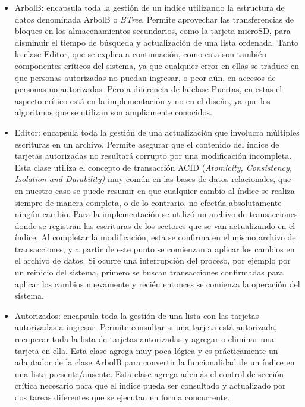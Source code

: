 \begin{itemize}
	\item ArbolB: encapsula toda la gestión de un índice utilizando la estructura de datos denominada ArbolB  o \emph{BTree}. Permite aprovechar las transferencias de bloques en los almacenamientos secundarios, como la tarjeta microSD, para disminuir el tiempo de búsqueda y actualización de una lista ordenada. Tanto la clase Editor, que se explica a continuación, como esta son también componentes críticos del sistema, ya que cualquier error en ellas se traduce en que personas autorizadas no puedan ingresar, o peor aún, en accesos de personas no autorizadas. Pero a diferencia de la clase Puertas, en estas el aspecto crítico está en la implementación y no en el diseño, ya que los algoritmos que se utilizan son ampliamente conocidos.
		
	\item Editor: encapsula toda la gestión de una actualización que involucra múltiples escrituras en un archivo. Permite asegurar que el contenido del índice de tarjetas autorizadas no resultará corrupto por una modificación incompleta. Esta clase utiliza el concepto de transacción ACID (\emph{Atomicity, Consistency, Isolation and Durability)} muy común en las bases de datos relacionales, que en nuestro caso se puede resumir en que cualquier cambio al índice se realiza siempre de manera completa, o de lo contrario, no efectúa absolutamente ningún cambio. Para la implementación se utilizó un archivo de transacciones donde se registran las escrituras de los sectores que se van actualizando en el índice. Al completar la modificación, esta se confirma en el mismo archivo de transacciones, y a partir de este punto se comienzan a aplicar los cambios en el archivo de datos. Si ocurre una interrupción del proceso, por ejemplo por un reinicio del sistema, primero se buscan transacciones confirmadas para aplicar los cambios nuevamente y recién entonces se comienza la operación del sistema.

\FloatBarrier

	\item Autorizados: encapsula toda la gestión de una lista con las tarjetas autorizadas a ingresar. Permite consultar si una tarjeta está autorizada, recuperar toda la lista de tarjetas autorizadas y agregar o eliminar una tarjeta en ella. Esta clase agrega muy poca lógica y es prácticamente un adaptador de la clase ArbolB para convertir la funcionalidad de un índice en una lista presente/ausente. Esta clase agrega además el control de sección crítica necesario para que el índice pueda ser consultado y actualizado por dos tareas diferentes que se ejecutan en forma concurrente.


\end{itemize}
